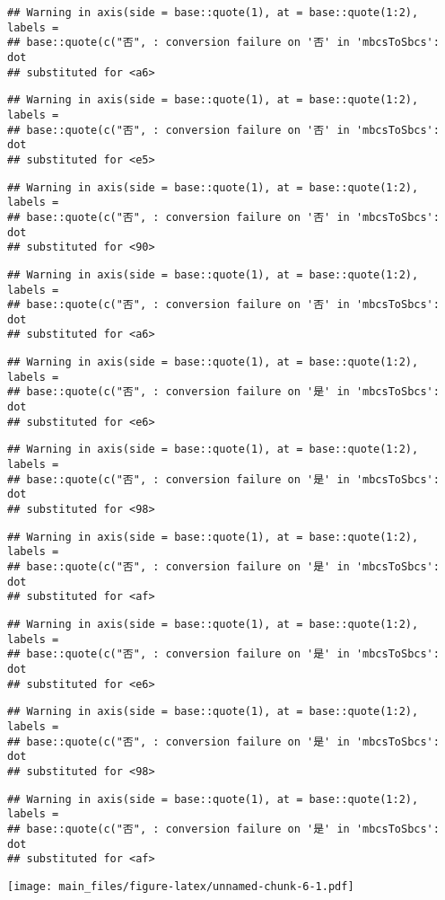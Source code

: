\documentclass[
]{article}
\begin{document}
\begin{verbatim}
## Warning in axis(side = base::quote(1), at = base::quote(1:2), labels =
## base::quote(c("否", : conversion failure on '否' in 'mbcsToSbcs': dot
## substituted for <a6>
\end{verbatim}

\begin{verbatim}
## Warning in axis(side = base::quote(1), at = base::quote(1:2), labels =
## base::quote(c("否", : conversion failure on '否' in 'mbcsToSbcs': dot
## substituted for <e5>
\end{verbatim}

\begin{verbatim}
## Warning in axis(side = base::quote(1), at = base::quote(1:2), labels =
## base::quote(c("否", : conversion failure on '否' in 'mbcsToSbcs': dot
## substituted for <90>
\end{verbatim}

\begin{verbatim}
## Warning in axis(side = base::quote(1), at = base::quote(1:2), labels =
## base::quote(c("否", : conversion failure on '否' in 'mbcsToSbcs': dot
## substituted for <a6>
\end{verbatim}

\begin{verbatim}
## Warning in axis(side = base::quote(1), at = base::quote(1:2), labels =
## base::quote(c("否", : conversion failure on '是' in 'mbcsToSbcs': dot
## substituted for <e6>
\end{verbatim}

\begin{verbatim}
## Warning in axis(side = base::quote(1), at = base::quote(1:2), labels =
## base::quote(c("否", : conversion failure on '是' in 'mbcsToSbcs': dot
## substituted for <98>
\end{verbatim}

\begin{verbatim}
## Warning in axis(side = base::quote(1), at = base::quote(1:2), labels =
## base::quote(c("否", : conversion failure on '是' in 'mbcsToSbcs': dot
## substituted for <af>
\end{verbatim}

\begin{verbatim}
## Warning in axis(side = base::quote(1), at = base::quote(1:2), labels =
## base::quote(c("否", : conversion failure on '是' in 'mbcsToSbcs': dot
## substituted for <e6>
\end{verbatim}

\begin{verbatim}
## Warning in axis(side = base::quote(1), at = base::quote(1:2), labels =
## base::quote(c("否", : conversion failure on '是' in 'mbcsToSbcs': dot
## substituted for <98>
\end{verbatim}

\begin{verbatim}
## Warning in axis(side = base::quote(1), at = base::quote(1:2), labels =
## base::quote(c("否", : conversion failure on '是' in 'mbcsToSbcs': dot
## substituted for <af>
\end{verbatim}

\texttt{[image: main\_files/figure-latex/unnamed-chunk-6-1.pdf]}
\end{document}
